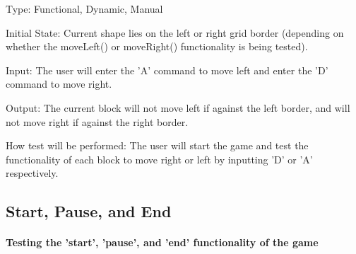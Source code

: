 \documentclass[12pt, titlepage]{article}
\begin{document}
\begin{enumerate}
Type: Functional, Dynamic, Manual
					
Initial State: Current shape lies on the left or right grid border (depending on whether the moveLeft() or moveRight() functionality is being tested).
					
Input: The user will enter the 'A' command to move left and enter the 'D' command to move right.
					
Output: The current block will not move left if against the left border, and will not move right if against the right border.
					
How test will be performed: The user will start the game and test the functionality of each block to move right or left by inputting 'D' or 'A' respectively.
                    
\end{enumerate}

\subsection{Start, Pause, and End}

\paragraph{Testing the 'start', 'pause', and 'end' functionality of the game}
\end{document}
